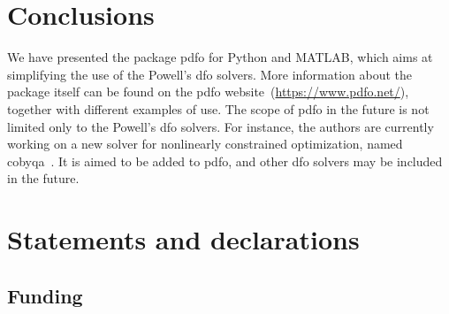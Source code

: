 \documentclass[
    smallextended,  %
    final,          %
]{svjour3}
\begin{document}


\section{Conclusions}
\label{sec:conclude}

We have presented the package \gls{pdfo} for Python and MATLAB, which aims at simplifying the use of the Powell's \gls{dfo} solvers.
More information about the package itself can be found on the \gls{pdfo} website~(\url{https://www.pdfo.net/}), together with different examples of use.
The scope of \gls{pdfo} in the future is not limited only to the Powell's \gls{dfo} solvers.
For instance, the authors are currently working on a new solver for nonlinearly constrained optimization, named \gls{cobyqa}~\cite{Ragonneau_2022}.
It is aimed to be added to \gls{pdfo}, and other \gls{dfo} solvers may be included in the future.

\section{Statements and declarations}

\subsection{Funding}
\end{document}
